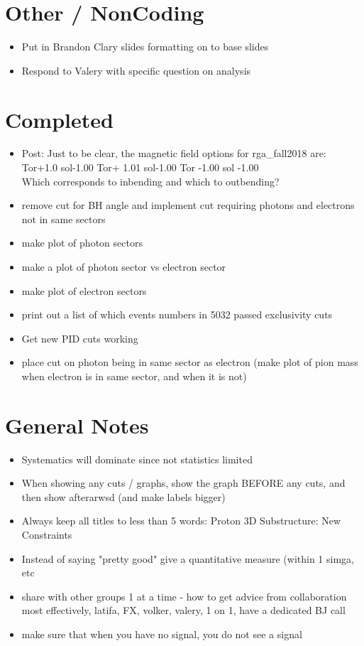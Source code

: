 \section{Other / NonCoding}
\begin{itemize}
    \item Put in Brandon Clary slides formatting on to base slides
    \item Respond to Valery with specific question on analysis
\end{itemize}


\section{Completed}
\begin{itemize}
     \item Post: Just to be clear, the magnetic field options for rga\_fall2018 are:
        Tor+1.0 sol-1.00
        Tor+ 1.01 sol-1.00
        Tor -1.00 sol -1.00\\
        Which corresponds to inbending and which to outbending?
    \item remove cut for BH angle and implement cut requiring photons and electrons not in same sectors
    \item make plot of photon sectors
    \item make a plot of photon sector vs electron sector
    \item make plot of electron sectors
    \item print out a list of which events numbers in 5032 passed exclusivity cuts
    \item Get new PID cuts working
    \item place cut on photon being in same sector as electron (make plot of pion mass when electron is in same sector, and when it is not)
\end{itemize}


\section{General Notes}
\begin{itemize}
    \item Systematics will dominate since not statistics limited
    \item When showing any cuts / graphs, show the graph BEFORE any cuts, and then show afterarwsd (and make labels bigger)
    \item Always keep all titles to less than 5 words: Proton 3D Substructure: New Constraints
    \item Instead of saying "pretty good" give a quantitative measure (within 1 simga, etc
    \item share with other groups 1 at a time - how to get advice from collaboration most effectively, latifa, FX, volker, valery, 1 on 1, have a dedicated BJ call
    \item make sure that when you have no signal, you do not see a signal
\end{itemize}

